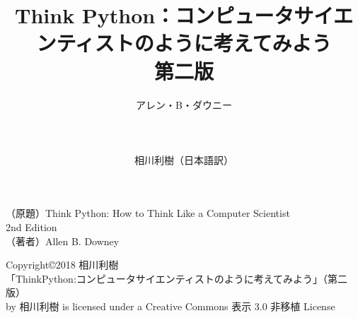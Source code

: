 \documentclass[a4j,12pt,makeidx]{jbook}
\begin{document}
 
 \title{Think Python：コンピュータサイエンティストのように考えてみよう\\
第二版}

 \author{アレン・B・ダウニー　\\
\\
\\
\\
相川利樹（日本語訳）}
 \date{}
 \maketitle
 \vfill
 \begin{center}
（原題）Think Python: How to Think Like a Computer Scientist \\
2nd Edition \\
 （著者）Allen B. Downey
 \end{center}
 \vfill
 {\small
 Copyright\copyright 2018 相川利樹  \\
 「ThinkPython:コンピュータサイエンティストのように考えてみよう」（第二版） \\ by 相川利樹 is licensed under a Creative Commons 表示 3.0 非移植 License
 }
 \tableofcontents
 \clearpage
 \clearpage
\end{document}
